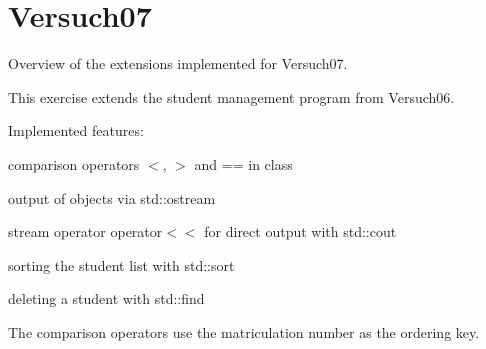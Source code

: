 \chapter{Versuch07}
\hypertarget{versuch07}{}\label{versuch07}
Overview of the extensions implemented for Versuch07.

This exercise extends the student management program from Versuch06.

Implemented features\+:
\begin{DoxyItemize}
\item comparison operators {\ttfamily \texorpdfstring{$<$}{<}}, {\ttfamily \texorpdfstring{$>$}{>}} and {\ttfamily ==} in class 
\item output of  objects via {\ttfamily std\+::ostream}
\item stream operator {\ttfamily operator\texorpdfstring{$<$}{<}\texorpdfstring{$<$}{<}} for direct output with {\ttfamily std\+::cout}
\item sorting the student list with {\ttfamily std\+::sort}
\item deleting a student with {\ttfamily std\+::find}
\end{DoxyItemize}

The comparison operators use the matriculation number as the ordering key. 